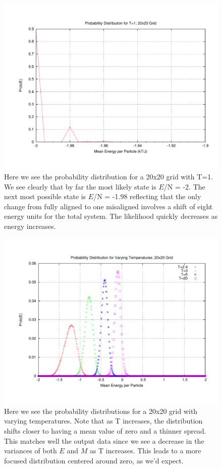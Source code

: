 \documentclass[11pt,a4paper]{article}
\begin{document}
\begin{figure}
\centering
\includegraphics[width=1.0\textwidth]{prob_T1.pdf}
\caption{Here we see the probability distribution for a 20x20 grid with T=1. We see clearly that by far the most likely state is $E$/N = -2. The next most possible state is $E$/N = -1.98 reflecting that the only change from fully aligned to one misaligned involves a shift of eight energy units for the total system. The likelihood quickly decreases as energy increases.}
\end{figure}
\begin{figure}
\centering
\includegraphics[width=1.0\textwidth]{prob_vT.pdf}
\caption{Here we see the probability distributions for a 20x20 grid with varying temperatures. Note that as T increases, the distribution shifts closer to having a mean value of zero and a thinner spread. This matches well the output data since we see a decrease in the variances of both $E$ and $M$ as T increases. This leads to a more focused distribution centered around zero, as we'd expect.}
\end{figure}
\end{document}

